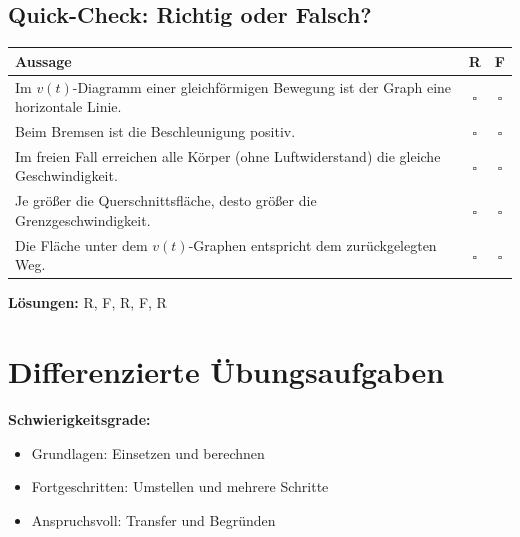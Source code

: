 \documentclass[11pt,a4paper]{article}
\begin{document}
\subsection{Quick-Check: Richtig oder Falsch?}

\begin{center}
\begin{tabular}{|p{10cm}|c|c|}
\hline
\rowcolor{lightblue}
\textbf{Aussage} & \textbf{R} & \textbf{F} \\
\hline
Im $v(t)$-Diagramm einer gleichförmigen Bewegung ist der Graph eine horizontale Linie. & $\square$ & $\square$ \\
\hline
Beim Bremsen ist die Beschleunigung positiv. & $\square$ & $\square$ \\
\hline
Im freien Fall erreichen alle Körper (ohne Luftwiderstand) die gleiche Geschwindigkeit. & $\square$ & $\square$ \\
\hline
Je größer die Querschnittsfläche, desto größer die Grenzgeschwindigkeit. & $\square$ & $\square$ \\
\hline
Die Fläche unter dem $v(t)$-Graphen entspricht dem zurückgelegten Weg. & $\square$ & $\square$ \\
\hline
\end{tabular}
\end{center}

\textbf{Lösungen:} R, F, R, F, R

\newpage
\section{Differenzierte Übungsaufgaben}

\begin{tcolorbox}[colback=merkegreen!10, colframe=merkegreen, boxrule=1pt]
\textbf{Schwierigkeitsgrade:}
\begin{itemize}
\item[{$\bigstar$}] Grundlagen: Einsetzen und berechnen
\item[{$\bigstar\bigstar$}] Fortgeschritten: Umstellen und mehrere Schritte
\item[{$\bigstar\bigstar\bigstar$}] Anspruchsvoll: Transfer und Begründen
\end{itemize}
\end{tcolorbox}

\vspace{0.5cm}
\end{document}
